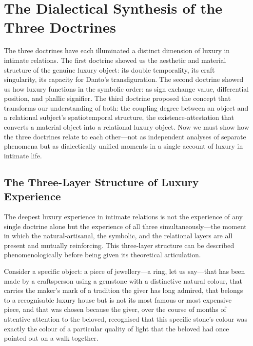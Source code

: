 \section{The Dialectical Synthesis of the Three Doctrines}
\label{p16:sec:synthesis}

\noindent
The three doctrines have each illuminated a distinct dimension of luxury in intimate relations. The first doctrine showed us the aesthetic and material structure of the genuine luxury object: its double temporality, its craft singularity, its capacity for Danto's transfiguration. The second doctrine showed us how luxury functions in the symbolic order: as sign exchange value, differential position, and phallic signifier. The third doctrine proposed the concept that transforms our understanding of both: the coupling degree between an object and a relational subject's spatiotemporal structure, the existence-attestation that converts a material object into a relational luxury object. Now we must show how the three doctrines relate to each other---not as independent analyses of separate phenomena but as dialectically unified moments in a single account of luxury in intimate life.

\subsection{The Three-Layer Structure of Luxury Experience}
\label{p16:subsec:three_layer}

\noindent
The deepest luxury experience in intimate relations is not the experience of any single doctrine alone but the experience of all three simultaneously---the moment in which the natural-artisanal, the symbolic, and the relational layers are all present and mutually reinforcing. This three-layer structure can be described phenomenologically before being given its theoretical articulation.

Consider a specific object: a piece of jewellery---a ring, let us say---that has been made by a craftsperson using a gemstone with a distinctive natural colour, that carries the maker's mark of a tradition the giver has long admired, that belongs to a recognisable luxury house but is not its most famous or most expensive piece, and that was chosen because the giver, over the course of months of attentive attention to the beloved, recognised that this specific stone's colour was exactly the colour of a particular quality of light that the beloved had once pointed out on a walk together.

